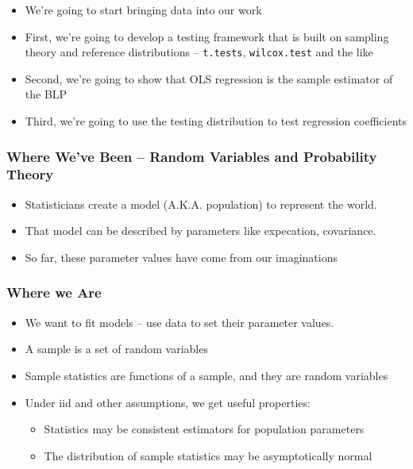 \documentclass[
]{book}
\providecommand{\tightlist}{%
  \setlength{\itemsep}{0pt}\setlength{\parskip}{0pt}}
\theoremstyle{definition}
\theoremstyle{definition}
\theoremstyle{definition}
\theoremstyle{definition}
\theoremstyle{remark}
\begin{document}
\begin{itemize}
\tightlist
\item
  We're going to start bringing data into our work
\item
  First, we're going to develop a testing framework that is built on sampling theory and reference distributions -- \texttt{t.tests}, \texttt{wilcox.test} and the like
\item
  Second, we're going to show that OLS regression is the sample estimator of the BLP
\item
  Third, we're going to use the testing distribution to test regression coefficients
\end{itemize}

\hypertarget{where-weve-been-random-variables-and-probability-theory}{%
\subsubsection{Where We've Been -- Random Variables and Probability Theory}\label{where-weve-been-random-variables-and-probability-theory}}

\begin{itemize}
\tightlist
\item
  Statisticians create a model (A.K.A. population) to represent the world.
\item
  That model can be described by parameters like expecation, covariance.
\item
  So far, these parameter values have come from our imaginations
\end{itemize}

\hypertarget{where-we-are}{%
\subsubsection{Where we Are}\label{where-we-are}}

\begin{itemize}
\tightlist
\item
  We want to fit models -- use data to set their parameter values.
\item
  A sample is a set of random variables
\item
  Sample statistics are functions of a sample, and they are random variables
\item
  Under iid and other assumptions, we get useful properties:

  \begin{itemize}
  \tightlist
  \item
    Statistics may be consistent estimators for population parameters
  \item
    The distribution of sample statistics may be asymptotically normal
  \end{itemize}
\end{itemize}
\end{document}
